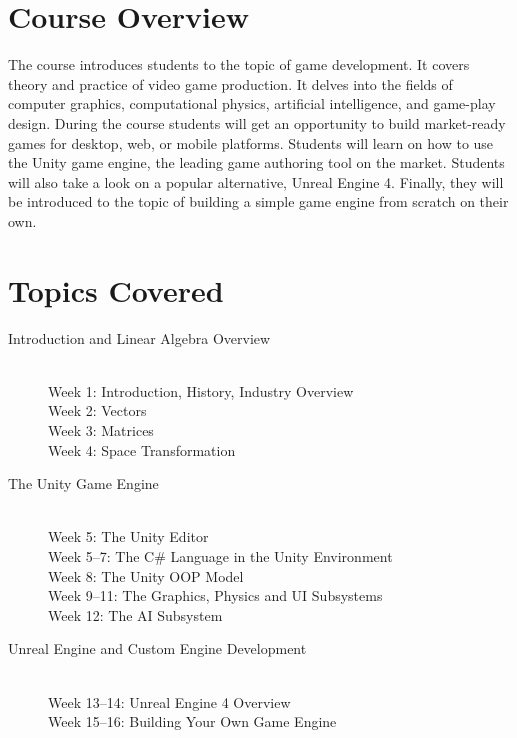 \documentclass[12pt,a4paper,oneside]{article}
\begin{document}
    \section{Course Overview}

        The course introduces students to the topic of game development. It
        covers theory and practice of video game production. It delves into the
        fields of computer graphics, computational physics, artificial
        intelligence, and game-play design. During the course students will get
        an opportunity to build market-ready games for desktop, web, or mobile
        platforms. Students will learn on how to use the Unity game engine, the
        leading game authoring tool on the market. Students will also take a
        look on a popular alternative, Unreal Engine 4. Finally, they will be
        introduced to the topic of building a simple game engine from scratch on
        their own.

    \section{Topics Covered}

        \begin{description}
            \item[Introduction and Linear Algebra Overview]\hfill\\
                Week 1: Introduction, History, Industry Overview\\
                Week 2: Vectors\\
                Week 3: Matrices\\
                Week 4: Space Transformation
            \item[The Unity Game Engine]\hfill\\
                Week 5: The Unity Editor\\
                Week 5--7: The C\# Language in the Unity Environment\\
                Week 8: The Unity OOP Model\\
                Week 9--11: The Graphics, Physics and UI Subsystems\\
                Week 12: The AI Subsystem
            \item[Unreal Engine and Custom Engine Development]\hfill\\
                Week 13--14: Unreal Engine 4 Overview\\
                Week 15--16: Building Your Own Game Engine
        \end{description}
\end{document}
